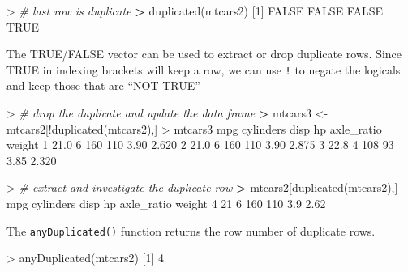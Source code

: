 \documentclass[
]{book}
\newenvironment{Shaded}{\begin{snugshade}}{\end{snugshade}}
\newcommand{\CommentTok}[1]{\textcolor[rgb]{0.56,0.35,0.01}{\textit{#1}}}
\newcommand{\ConstantTok}[1]{\textcolor[rgb]{0.00,0.00,0.00}{#1}}
\newcommand{\DecValTok}[1]{\textcolor[rgb]{0.00,0.00,0.81}{#1}}
\newcommand{\ErrorTok}[1]{\textcolor[rgb]{0.64,0.00,0.00}{\textbf{#1}}}
\newcommand{\FloatTok}[1]{\textcolor[rgb]{0.00,0.00,0.81}{#1}}
\newcommand{\FunctionTok}[1]{\textcolor[rgb]{0.00,0.00,0.00}{#1}}
\newcommand{\NormalTok}[1]{#1}
\newcommand{\OtherTok}[1]{\textcolor[rgb]{0.56,0.35,0.01}{#1}}
\newcommand{\SpecialCharTok}[1]{\textcolor[rgb]{0.00,0.00,0.00}{#1}}
\begin{document}
\begin{Shaded}
\begin{Highlighting}[]
\SpecialCharTok{\textgreater{}} \CommentTok{\# last row is duplicate}
\ErrorTok{\textgreater{}} \FunctionTok{duplicated}\NormalTok{(mtcars2)}
\NormalTok{[}\DecValTok{1}\NormalTok{] }\ConstantTok{FALSE} \ConstantTok{FALSE} \ConstantTok{FALSE}  \ConstantTok{TRUE}
\end{Highlighting}
\end{Shaded}

The TRUE/FALSE vector can be used to extract or drop duplicate rows. Since TRUE in indexing brackets will keep a row, we can use \texttt{!} to negate the logicals and keep those that are ``NOT TRUE''

\begin{Shaded}
\begin{Highlighting}[]
\SpecialCharTok{\textgreater{}} \CommentTok{\# drop the duplicate and update the data frame}
\ErrorTok{\textgreater{}}\NormalTok{ mtcars3 }\OtherTok{\textless{}{-}}\NormalTok{ mtcars2[}\SpecialCharTok{!}\FunctionTok{duplicated}\NormalTok{(mtcars2),]}
\SpecialCharTok{\textgreater{}}\NormalTok{ mtcars3}
\NormalTok{   mpg cylinders disp  hp axle\_ratio weight}
\DecValTok{1} \FloatTok{21.0}         \DecValTok{6}  \DecValTok{160} \DecValTok{110}       \FloatTok{3.90}  \FloatTok{2.620}
\DecValTok{2} \FloatTok{21.0}         \DecValTok{6}  \DecValTok{160} \DecValTok{110}       \FloatTok{3.90}  \FloatTok{2.875}
\DecValTok{3} \FloatTok{22.8}         \DecValTok{4}  \DecValTok{108}  \DecValTok{93}       \FloatTok{3.85}  \FloatTok{2.320}
\end{Highlighting}
\end{Shaded}

\begin{Shaded}
\begin{Highlighting}[]
\SpecialCharTok{\textgreater{}} \CommentTok{\# extract and investigate the duplicate row}
\ErrorTok{\textgreater{}}\NormalTok{ mtcars2[}\FunctionTok{duplicated}\NormalTok{(mtcars2),]}
\NormalTok{  mpg cylinders disp  hp axle\_ratio weight}
\DecValTok{4}  \DecValTok{21}         \DecValTok{6}  \DecValTok{160} \DecValTok{110}        \FloatTok{3.9}   \FloatTok{2.62}
\end{Highlighting}
\end{Shaded}

The \texttt{anyDuplicated()} function returns the row number of duplicate rows.

\begin{Shaded}
\begin{Highlighting}[]
\SpecialCharTok{\textgreater{}} \FunctionTok{anyDuplicated}\NormalTok{(mtcars2)}
\NormalTok{[}\DecValTok{1}\NormalTok{] }\DecValTok{4}
\end{Highlighting}
\end{Shaded}
\end{document}

